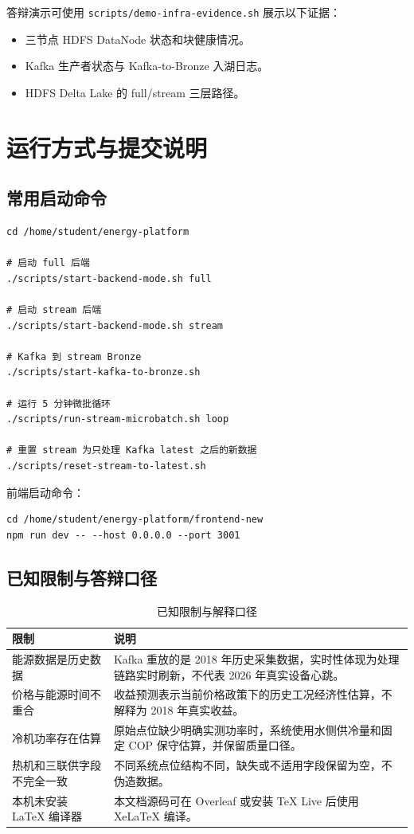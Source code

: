 \documentclass[UTF8,11pt,a4paper]{ctexart}
\newcommand{\code}[1]{\texttt{#1}}
\begin{document}
答辩演示可使用 \code{scripts/demo-infra-evidence.sh} 展示以下证据：

\begin{itemize}
  \item 三节点 HDFS DataNode 状态和块健康情况。
  \item Kafka 生产者状态与 Kafka-to-Bronze 入湖日志。
  \item HDFS Delta Lake 的 full/stream 三层路径。
\end{itemize}

\section{运行方式与提交说明}

\subsection{常用启动命令}

\begin{verbatim}
cd /home/student/energy-platform

# 启动 full 后端
./scripts/start-backend-mode.sh full

# 启动 stream 后端
./scripts/start-backend-mode.sh stream

# Kafka 到 stream Bronze
./scripts/start-kafka-to-bronze.sh

# 运行 5 分钟微批循环
./scripts/run-stream-microbatch.sh loop

# 重置 stream 为只处理 Kafka latest 之后的新数据
./scripts/reset-stream-to-latest.sh
\end{verbatim}

前端启动命令：

\begin{verbatim}
cd /home/student/energy-platform/frontend-new
npm run dev -- --host 0.0.0.0 --port 3001
\end{verbatim}

\subsection{已知限制与答辩口径}

\begin{table}[H]
\centering
\small
\begin{tabularx}{\textwidth}{p{3.3cm}Y}
\toprule
限制 & 说明 \\
\midrule
能源数据是历史数据 & Kafka 重放的是 2018 年历史采集数据，实时性体现为处理链路实时刷新，不代表 2026 年真实设备心跳。 \\
价格与能源时间不重合 & 收益预测表示当前价格政策下的历史工况经济性估算，不解释为 2018 年真实收益。 \\
冷机功率存在估算 & 原始点位缺少明确实测功率时，系统使用水侧供冷量和固定 COP 保守估算，并保留质量口径。 \\
热机和三联供字段不完全一致 & 不同系统点位结构不同，缺失或不适用字段保留为空，不伪造数据。 \\
本机未安装 LaTeX 编译器 & 本文档源码可在 Overleaf 或安装 TeX Live 后使用 XeLaTeX 编译。 \\
\bottomrule
\end{tabularx}
\caption{已知限制与解释口径}
\end{table}
\end{document}
